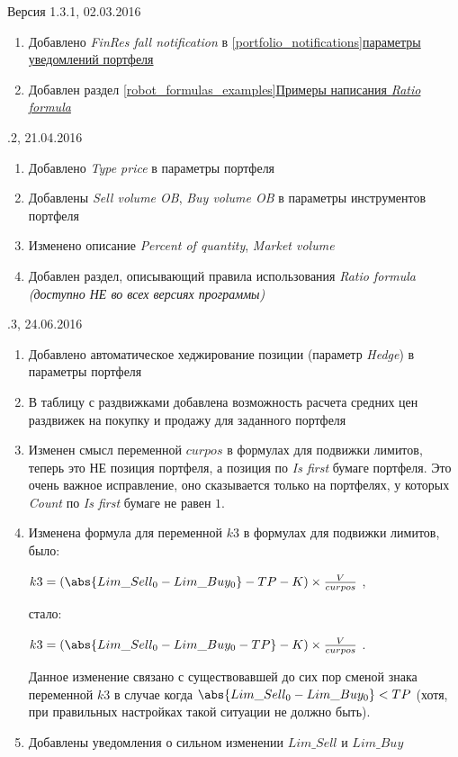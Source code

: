 Версия 1.3.1, 02.03.2016
\vspace{\topsep}
\begin{enumerate}
	\item Добавлено \textit{FinRes fall notification} в \hyperref[portfolio_notifications]{\ref{portfolio_notifications}параметры уведомлений портфеля}
	\item Добавлен раздел \hyperref[robot_formulas_examples]{\ref{robot_formulas_examples}Примеры написания \textit{Ratio formula}}
\end{enumerate}

\vspace{5mm}

.2, 21.04.2016
\begin{enumerate}
	\item Добавлено \textit{Type price} в параметры портфеля
	\item Добавлены \textit{Sell volume OB}, \textit{Buy volume OB} в параметры инструментов портфеля
	\item Изменено описание \textit{Percent of quantity}, \textit{Market volume}
	\item Добавлен раздел, описывающий правила использования \textit{Ratio formula} \textit{(доступно НЕ во всех версиях программы)}
\end{enumerate}

\vspace{5mm}

.3, 24.06.2016
\begin{enumerate}
	\item Добавлено автоматическое хеджирование позиции (параметр \textit{Hedge}) в параметры портфеля
	\item В таблицу с раздвижками добавлена возможность расчета средних цен раздвижек на покупку и продажу для заданного портфеля
	\item Изменен смысл переменной $curpos$ в формулах для подвижки лимитов, теперь это НЕ позиция портфеля, а позиция по \textit{Is first} бумаге портфеля.
		Это очень важное исправление, оно сказывается только на портфелях, у которых \textit{Count} по \textit{Is first} бумаге не равен $1$.
	\item Изменена формула для переменной $k3$ в формулах для подвижки лимитов, было:
		
		$k3 = \left(\abs{Lim\_Sell_0 - Lim\_Buy_0} - TP - K \right) \times \frac{V}{curpos}$ ,
		
		стало:
		
		$k3 = \left(\abs{Lim\_Sell_0 - Lim\_Buy_0 - TP} - K \right) \times \frac{V}{curpos}$ .
		
		Данное изменение связано с существовавшей до сих пор сменой знака переменной $k3$ в случае когда $\abs{Lim\_Sell_0 - Lim\_Buy_0} < TP$ (хотя, при правильных настройках
		такой ситуации не должно быть).
	\item Добавлены уведомления о сильном изменении $Lim\_Sell$ и $Lim\_Buy$
\end{enumerate}

